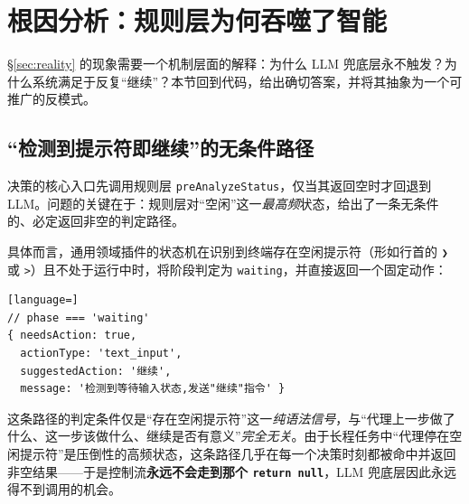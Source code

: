 \section{根因分析：规则层为何吞噬了智能}
\label{sec:rootcause}

\S\ref{sec:reality} 的现象需要一个机制层面的解释：为什么 LLM 兜底层永不触发？为什么系统满足于反复“继续”？本节回到代码，给出确切答案，并将其抽象为一个可推广的反模式。

\subsection{“检测到提示符即继续”的无条件路径}

决策的核心入口先调用规则层 \texttt{preAnalyzeStatus}，仅当其返回空时才回退到 LLM。问题的关键在于：规则层对“空闲”这一\emph{最高频}状态，给出了一条无条件的、必定返回非空的判定路径。

具体而言，通用领域插件的状态机在识别到终端存在空闲提示符（形如行首的 \texttt{❯} 或 \texttt{>}）且不处于运行中时，将阶段判定为 \texttt{waiting}，并直接返回一个固定动作：
\begin{lstlisting}[language=]
// phase === 'waiting'
{ needsAction: true,
  actionType: 'text_input',
  suggestedAction: '继续',
  message: '检测到等待输入状态,发送"继续"指令' }
\end{lstlisting}
这条路径的判定条件仅是“存在空闲提示符”这一\emph{纯语法信号}，与“代理上一步做了什么、这一步该做什么、继续是否有意义”\emph{完全无关}。由于长程任务中“代理停在空闲提示符”是压倒性的高频状态，这条路径几乎在每一个决策时刻都被命中并返回非空结果——于是控制流\textbf{永远不会走到那个 \texttt{return null}}，LLM 兜底层因此永远得不到调用的机会。

